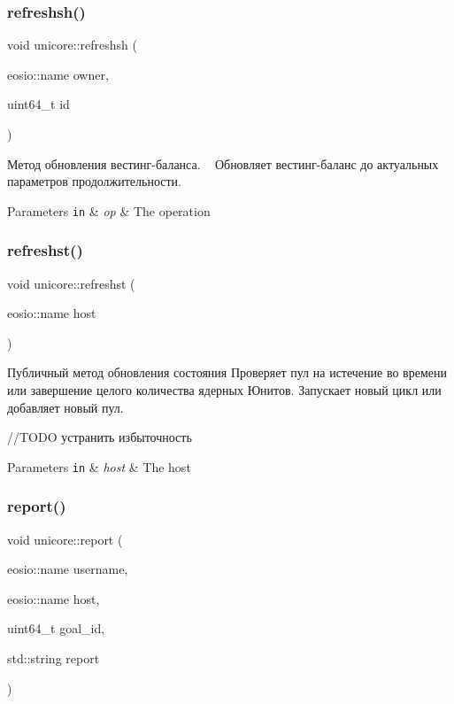 \subsubsection{\texorpdfstring{refreshsh()}{refreshsh()}}
{\footnotesize\ttfamily void unicore\+::refreshsh (\begin{DoxyParamCaption}\item[{eosio\+::name}]{owner,  }\item[{uint64\+\_\+t}]{id }\end{DoxyParamCaption})}



Метод обновления вестинг-\/баланса. ~\newline
Обновляет вестинг-\/баланс до актуальных параметров продолжительности. 


\begin{DoxyParams}[1]{Parameters}
\mbox{\tt in}  & {\em op} & The operation \\
\hline
\end{DoxyParams}
\mbox{\label{classunicore_a2a410729955a5bc11fe3b3051f10a4c9}} 
\subsubsection{\texorpdfstring{refreshst()}{refreshst()}}
{\footnotesize\ttfamily void unicore\+::refreshst (\begin{DoxyParamCaption}\item[{eosio\+::name}]{host }\end{DoxyParamCaption})}



Публичный метод обновления состояния Проверяет пул на истечение во времени или завершение целого количества ядерных Юнитов. Запускает новый цикл или добавляет новый пул. 

//\+T\+O\+DO устранить избыточность


\begin{DoxyParams}[1]{Parameters}
\mbox{\tt in}  & {\em host} & The host \\
\hline
\end{DoxyParams}
\mbox{\label{classunicore_ac0e6bf94b8bfd28e08c364631a357d91}} 
\subsubsection{\texorpdfstring{report()}{report()}}
{\footnotesize\ttfamily void unicore\+::report (\begin{DoxyParamCaption}\item[{eosio\+::name}]{username,  }\item[{eosio\+::name}]{host,  }\item[{uint64\+\_\+t}]{goal\+\_\+id,  }\item[{std\+::string}]{report }\end{DoxyParamCaption})}



